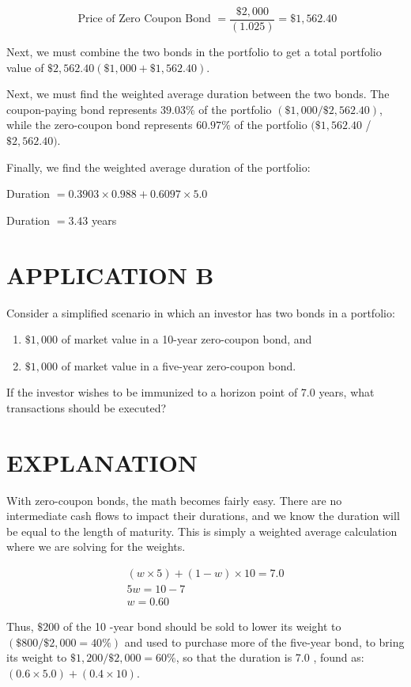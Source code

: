 \documentclass[11pt]{article}
\begin{document}
$$
\text { Price of Zero Coupon Bond }=\frac{\$ 2,000}{(1.025)}=\$ 1,562.40
$$

Next, we must combine the two bonds in the portfolio to get a total portfolio value of $\$ 2,562.40(\$ 1,000+\$ 1,562.40)$.

Next, we must find the weighted average duration between the two bonds. The coupon-paying bond represents $39.03 \%$ of the portfolio $(\$ 1,000 / \$ 2,562.40)$, while the zero-coupon bond represents $60.97 \%$ of the portfolio $(\$ 1,562.40$ / $\$ 2,562.40)$.

Finally, we find the weighted average duration of the portfolio:

Duration $=0.3903 \times 0.988+0.6097 \times 5.0$

Duration $=3.43$ years

\section*{APPLICATION B}
Consider a simplified scenario in which an investor has two bonds in a portfolio:

\begin{enumerate}
  \item $\$ 1,000$ of market value in a 10-year zero-coupon bond, and
  \item $\$ 1,000$ of market value in a five-year zero-coupon bond.
\end{enumerate}

If the investor wishes to be immunized to a horizon point of 7.0 years, what transactions should be executed?

\section*{EXPLANATION}
With zero-coupon bonds, the math becomes fairly easy. There are no intermediate cash flows to impact their durations, and we know the duration will be equal to the length of maturity. This is simply a weighted average calculation where we are solving for the weights.

$$
\begin{gathered}
(w \times 5)+(1-w) \times 10=7.0 \\
5 w=10-7 \\
w=0.60
\end{gathered}
$$

Thus, $\$ 200$ of the 10 -year bond should be sold to lower its weight to $(\$ 800 / \$ 2,000=40 \%)$ and used to purchase more of the five-year bond, to bring its weight to $\$ 1,200 / \$ 2,000=60 \%$, so that the duration is 7.0 , found as: $(0.6 \times 5.0)+(0.4 \times 10)$.
\end{document}
